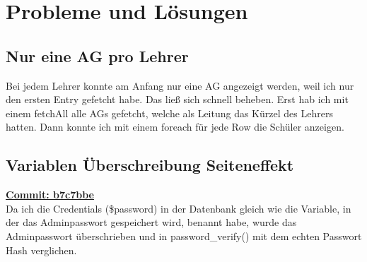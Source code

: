\section{Probleme und Lösungen}
\subsection{Nur eine AG pro Lehrer}
Bei jedem Lehrer konnte am Anfang nur eine AG angezeigt werden, weil ich nur den ersten Entry gefetcht habe. 
Das ließ sich schnell beheben. Erst hab ich mit einem fetchAll alle AGs gefetcht, welche als Leitung das Kürzel des Lehrers hatten.
Dann konnte ich mit einem foreach für jede Row die Schüler anzeigen.

\subsection{Variablen Überschreibung Seiteneffekt}
\href{https://github.com/Sobottasgithub/AG-Verwaltung/commit/b7c7bbeca822e3e15bb221e4e757440314da6ea3}{\textbf{Commit: b7c7bbe}}\\
Da ich die Credentials (\$password) in der Datenbank gleich wie die Variable, in der das Adminpasswort gespeichert wird, benannt habe, wurde das Adminpasswort überschrieben und in password\_verify() mit dem echten Passwort Hash verglichen.
\newpage
